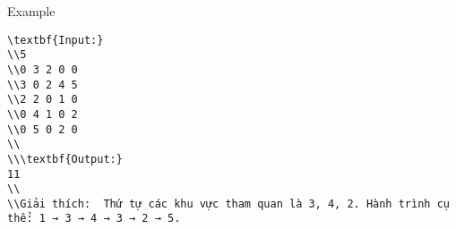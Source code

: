 Example
\begin{verbatim}
\textbf{Input:}
\\5
\\0 3 2 0 0
\\3 0 2 4 5
\\2 2 0 1 0
\\0 4 1 0 2
\\0 5 0 2 0
\\
\\\textbf{Output:}
11
\\
\\Giải thích:  Thứ tự các khu vực tham quan là 3, 4, 2. Hành trình cụ thể: 1 → 3 → 4 → 3 → 2 → 5.\end{verbatim}